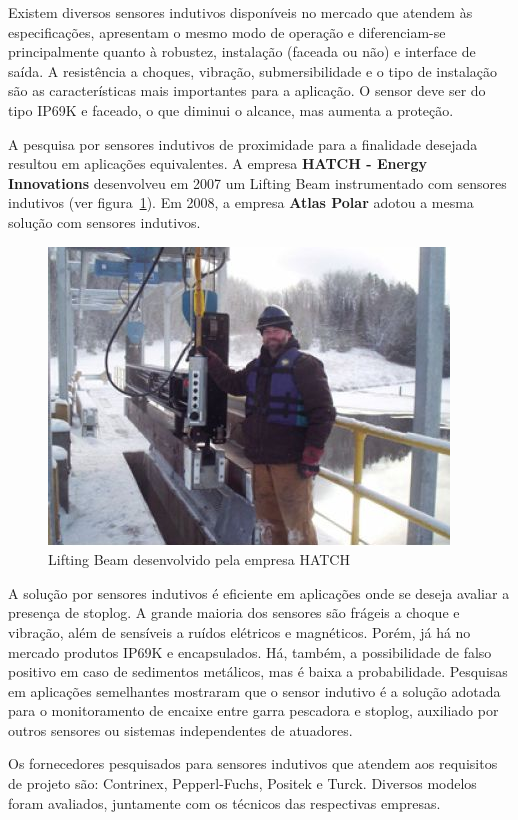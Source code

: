  Existem diversos sensores indutivos disponíveis no mercado que atendem às especificações, apresentam o mesmo modo de operação e diferenciam-se principalmente quanto à robustez, instalação (faceada ou não) e interface de saída. A resistência a choques, vibração, submersibilidade e o tipo de instalação são as características mais importantes para a aplicação. O sensor deve ser do tipo IP69K e faceado, o que diminui o alcance, mas aumenta a proteção.

 A pesquisa por sensores indutivos de proximidade para a finalidade desejada resultou em aplicações equivalentes. A empresa \textbf{HATCH - Energy Innovations} desenvolveu em 2007 um Lifting Beam instrumentado com sensores indutivos (ver figura~\ref{indutivo_1}). Em 2008, a empresa \textbf{Atlas Polar} adotou a mesma solução com sensores indutivos.

 \begin{figure}[H]
    \centering
    \includegraphics[width=0.5\columnwidth]{figs/indutivo/1.jpg}
    \caption{Lifting Beam desenvolvido pela empresa HATCH}
    \label{indutivo_1}
\end{figure}

A solução por sensores indutivos é eficiente em aplicações onde se deseja avaliar a presença de stoplog. A grande maioria dos sensores são frágeis a choque e vibração, além de sensíveis a ruídos elétricos e magnéticos. Porém, já há no mercado produtos IP69K e encapsulados. Há, também, a possibilidade de falso positivo em caso de sedimentos metálicos, mas é baixa a probabilidade.
Pesquisas em aplicações semelhantes mostraram que o sensor indutivo é a solução adotada para o monitoramento de encaixe entre garra pescadora e stoplog, auxiliado por outros sensores ou sistemas independentes de atuadores.

Os fornecedores pesquisados para sensores indutivos que atendem aos requisitos de projeto são: Contrinex, Pepperl-Fuchs, Positek e Turck. Diversos modelos foram avaliados, juntamente com os técnicos das respectivas empresas.

